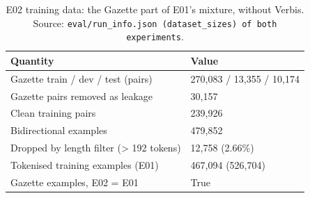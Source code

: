 \begin{table}[t]
\centering
\small
\begin{tabular}{ll}
\toprule
Quantity & Value \\
\midrule
Gazette train / dev / test (pairs) & 270,083 / 13,355 / 10,174 \\
Gazette pairs removed as leakage & 30,157 \\
Clean training pairs & 239,926 \\
Bidirectional examples & 479,852 \\
Dropped by length filter (> 192 tokens) & 12,758 (2.66\%) \\
Tokenised training examples (E01) & 467,094 (526,704) \\
Gazette examples, E02 = E01 & True \\
\bottomrule
\end{tabular}
\caption{E02 training data: the Gazette part of E01's mixture, without Verbis. Source: \texttt{eval/run\_info.json (dataset\_sizes) of both experiments}.}
\label{tab:e02-data}
\end{table}
